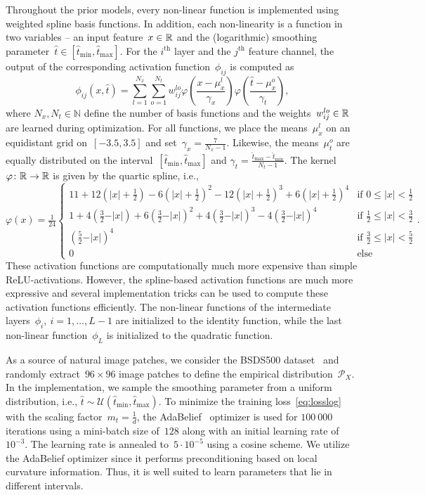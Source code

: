 \documentclass{article}
\newcommand{\N}{\mathbb{N}}
\def\hatt{{\widehat{t}}}
\newcommand{\tminh}{\hatt_\mathrm{min}}
\newcommand{\tmaxh}{\hatt_\mathrm{max}}
\newcommand{\dist}[1]{\mathcal{P}_{#1}}
\theoremstyle{plain}
\theoremstyle{definition}
\theoremstyle{remark}
\begin{document}
Throughout the prior models, every non-linear function is implemented using weighted spline basis functions.
In addition, each non-linearity is a function in two variables -- an input feature~$x\in\mathbb{R}$ and the (logarithmic) smoothing parameter~$\hatt\in[\tminh,\tmaxh]$.
For the $i^\text{th}$ layer and the $j^\text{th}$ feature channel, the output of the corresponding activation function~$\phi_{ij}$ is computed as
\[
\phi_{ij}(x,\hatt) = \sum_{l=1}^{N_x}\sum_{o=1}^{N_t} w_{ij}^{lo} \varphi\left(\frac{x-\mu_x^l}{\gamma_x}\right) \varphi\left(\frac{\hatt-\mu_x^o}{\gamma_t}\right),
\]
where $N_x,N_t\in\N$ define the number of basis functions and the weights~$w_{ij}^{lo}\in\mathbb{R}$ are learned during optimization.
For all functions, we place the means~$\mu_x^l$ on an equidistant grid on~$[-3.5,3.5]$ and set~$\gamma_x=\frac{7}{N_x-1}$.
Likewise, the means~$\mu_t^o$ are equally distributed on the interval~$[\tminh,\tmaxh]$ and $\gamma_t=\frac{\tmaxh-\tminh}{N_t-1}$.
The kernel~$\varphi\colon\mathbb{R}\to\mathbb{R}$ is given by the quartic spline, i.e.,
\[
\varphi(x)=\tfrac{1}{24}
\begin{cases}
11 + 12(\vert x\vert+\frac12) - 6(\vert x\vert+\frac12)^2 - 12(\vert x\vert+\frac12)^3 + 6(\vert x\vert+\frac12)^4 &\text{if } 0\leq\vert x\vert< \frac12\\
1 + 4(\frac32-\vert x\vert) + 6(\frac32-\vert x\vert)^2 + 4(\frac32-\vert x\vert)^3 - 4(\frac32-\vert x\vert)^4 &\text{if } \frac12\leq \vert x\vert< \frac32\\
(\frac52-\vert x\vert)^4 &\text{if } \frac32\leq \vert x\vert<\frac52\\
0 &\text{else}
\end{cases}.
\]
These activation functions are computationally much more expensive than simple ReLU-activations.
However, the spline-based activation functions are much more expressive and several implementation tricks can be used to compute these activation functions efficiently.
The non-linear functions of the intermediate layers~$\phi_i,\ i=1,\ldots,L-1$ are initialized to the identity function, while the last non-linear function~$\phi_L$ is initialized to the quadratic function.

As a source of natural image patches, we consider the BSDS500 dataset~\cite{MaFo01} and randomly extract~$96\times 96$ image patches to define the empirical distribution~$\dist{X}$.
In the implementation, we sample the smoothing parameter from a uniform distribution, i.e., $\hatt\sim\mathcal{U}(\tminh,\tmaxh)$.
To minimize the training loss~\eqref{eq:losslog} with the scaling factor~$m_t=\frac{1}{d}$, the AdaBelief~\citep{ZhTa20} optimizer is used for $100\ 000$ iterations using a mini-batch size of~$128$ along with an initial learning rate of $10^{-3}$.
The learning rate is annealed to~$5\cdot 10^{-5}$ using a cosine scheme.
We utilize the AdaBelief optimizer since it performs preconditioning based on local curvature information.
Thus, it is well suited to learn parameters that lie in different intervals.

\end{document}
